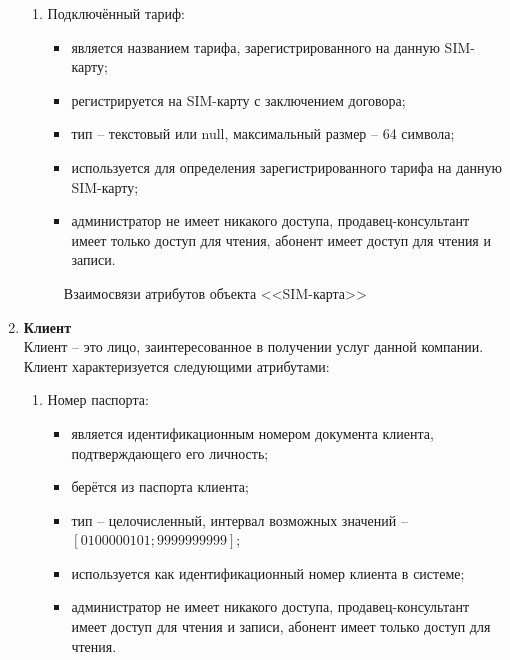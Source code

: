 \begin{enumerate}
\begin{enumerate}
        \item Подключённый тариф:
        \begin{itemize}
            \item является названием тарифа, зарегистрированного на данную SIM-карту;
            \item регистрируется на SIM-карту с заключением договора;
            \item тип -- текстовый или null, максимальный размер -- 64 символа;
            \item используется для определения зарегистрированного тарифа на данную SIM-карту;
            \item администратор не имеет никакого доступа, продавец-консультант имеет только доступ для чтения, абонент имеет доступ для чтения и записи.
        \end{itemize}
    \end{enumerate}
    \begin{figure}[H]
        \label{fig:sim-card-attributes}
        \caption{Взаимосвязи атрибутов объекта <<SIM-карта>>}
    \end{figure}

    \item \textbf{Клиент} \\
    Клиент -- это лицо, заинтересованное в получении услуг данной компании. Клиент характеризуется следующими атрибутами:
    \begin{enumerate}
        \item Номер паспорта:
        \begin{itemize}
            \item является идентификационным номером документа клиента, подтверждающего его личность;
            \item берётся из паспорта клиента;
            \item тип -- целочисленный, интервал возможных значений -- $[0100000101; 9999999999]$;
            \item используется как идентификационный номер клиента в системе;
            \item администратор не имеет никакого доступа, продавец-консультант имеет доступ для чтения и записи, абонент имеет только доступ для чтения.
        \end{itemize}


\end{enumerate}
\end{enumerate}
